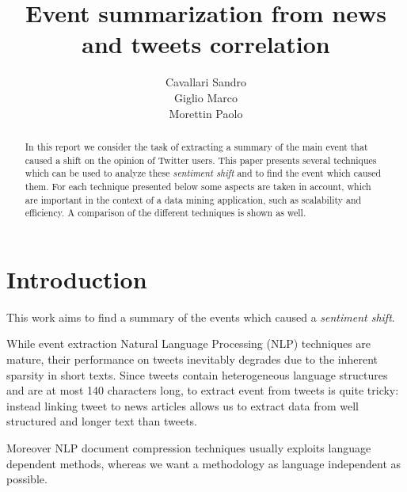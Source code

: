 \documentclass{acm_proc_article-sp-sigmod07}
\begin{document}
\title{Event summarization from news and tweets correlation}
\author{Cavallari Sandro\\Giglio Marco\\Morettin Paolo}

%
\maketitle
\begin{abstract}
In this report we consider the task of extracting a summary of the main event
that caused a shift on the opinion of Twitter users. This paper presents
several techniques which can be used to analyze these \emph{sentiment shift}
and to find the event which caused them. For each technique presented below
some aspects are taken in account, which are important in the context of a data
mining application, such as scalability and efficiency. A comparison of the
different techniques is shown as well.\end{abstract}   

\section*{Introduction}
This work aims to find a summary of the events which caused a \emph{sentiment shift}. 

While event extraction Natural Language Processing (NLP) techniques are mature,
their performance on tweets inevitably degrades due to the inherent sparsity in
short texts.  Since tweets contain heterogeneous language structures and are at
most 140 characters long, to extract event from tweets is quite tricky: instead
linking tweet to news articles allows us to extract data from well structured
and longer text than tweets.


Moreover NLP document compression techniques usually exploits language
dependent methods, whereas we want a methodology as language independent as
possible. 
\end{document}
